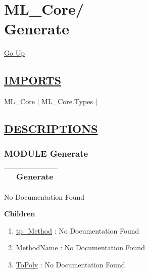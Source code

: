 \chapter*{\color{headfile}
{\large ML\_Core\slash\hspace{0pt}}
 \\
Generate
}
\hypertarget{ecldoc:toc:ML_Core.Generate}{}
\hyperlink{ecldoc:toc:root/ML_Core}{Go Up}

\section*{\underline{\textsf{IMPORTS}}}
\begin{doublespace}
{\large
ML\_Core |
ML\_Core.Types |
}
\end{doublespace}

\section*{\underline{\textsf{DESCRIPTIONS}}}
\subsection*{\textsf{\colorbox{headtoc}{\color{white} MODULE}
Generate}}

\hypertarget{ecldoc:ML_Core.Generate}{}

{\renewcommand{\arraystretch}{1.5}
\begin{tabularx}{\textwidth}{|>{\raggedright\arraybackslash}l|X|}
\hline
\hspace{0pt}\mytexttt{\color{red} } & \textbf{Generate} \\
\hline
\end{tabularx}
}

\par





No Documentation Found







\textbf{Children}
\begin{enumerate}
\item \hyperlink{ecldoc:ecldoc-tp_Method}{tp\_Method}
: No Documentation Found
\item \hyperlink{ecldoc:ml_core.generate.methodname}{MethodName}
: No Documentation Found
\item \hyperlink{ecldoc:ml_core.generate.topoly}{ToPoly}
: No Documentation Found
\end{enumerate}

